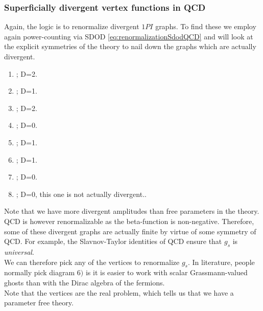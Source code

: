\subsubsection{Superficially divergent vertex functions in QCD}
Again, the logic is to renormalize divergent $1PI$ graphs. To find these we employ again power-counting via SDOD \ref{eq:renormalizationSdodQCD} and will look at the explicit symmetries of the theory to nail down the graphs which are actually divergent.
\begin{enumerate}
\item {}; \quad D=2.
\item {}; \quad D=1.
\item {}; \quad D=2.
\item {}; \quad D=0.
\item {}; \quad D=1.
\item {}; \quad D=1.
\item {}; \quad D=0.
\item {}; \quad D=0, this one is not actually divergent..
\end{enumerate}
Note that we have more divergent amplitudes than free parameters in the theory. QCD is however renormalizable as the beta-function is non-negative. Therefore, some of these divergent graphs are actually finite by virtue of some symmetry of QCD. For example, the Slavnov-Taylor identities of QCD  ensure that $g_s$ is \emph{universal}.\\
We can therefore pick any of the vertices to renormalize $g_s$. In literature, people normally pick diagram $6)$ is it is easier to work with scalar Grassmann-valued ghosts than with the Dirac algebra of the fermions. \\
Note that the vertices are the real problem, which tells us that we have a parameter free theory.
